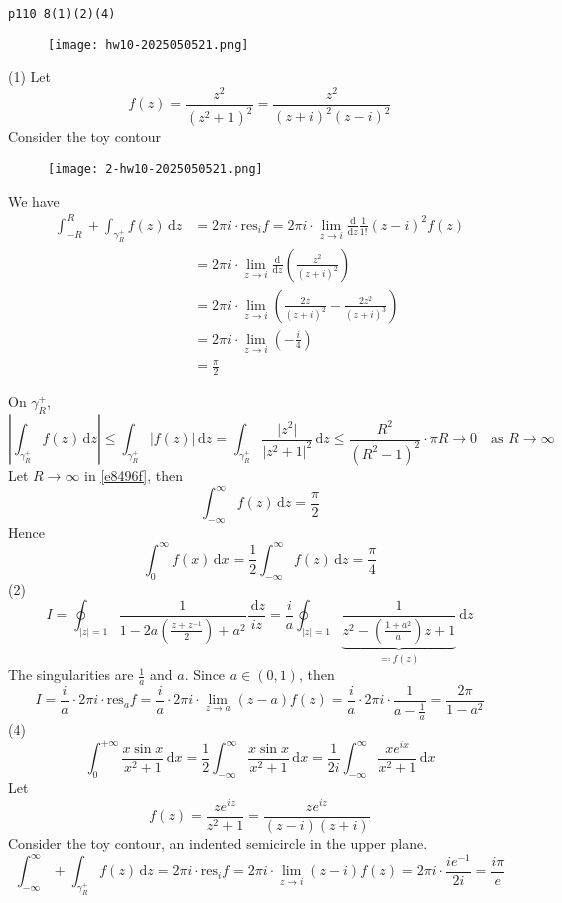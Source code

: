 \begin{lstlisting}
p110 8(1)(2)(4)
\end{lstlisting}
\begin{exercise}
\begin{figure}[H]
\centering
\texttt{[image: hw10-2025050521.png]}
\label{}
\end{figure}
\end{exercise}
(1)
Let
\[
f(z)=\frac{z^2}{(z^2+1)^2}=\frac{z^2}{(z+i)^2(z-i)^2}
\]
Consider the toy contour
\begin{figure}[H]
\centering
\texttt{[image: 2-hw10-2025050521.png]}
\label{}
\end{figure}
We have
\begin{equation}
\begin{aligned}
\int_{-R}^{R} +\int_{\gamma^{+}_{R}}f(z) \, \mathrm{d}z & =2\pi i \cdot\mathrm{res}_{i}f=2\pi i\cdot \lim_{ z \to i }\frac{\mathrm{d}}{\mathrm{d}z} \frac{1}{1!} (z-i)^2f(z) \\
 & =2\pi i\cdot \lim_{ z \to i } \frac{\mathrm{d}}{\mathrm{d}z} \left( \frac{z^2}{(z+i)^2} \right) \\
 & =2\pi i\cdot \lim_{ z \to i } \left( \frac{2z}{(z+i)^2}-\frac{2z^2}{(z+i)^{3}} \right)  \\
 & =2\pi i\cdot \lim_{ z \to i } \left( -\frac{i}{4}  \right) \\
 & =\frac{\pi}{2}
\end{aligned}
\label{e8496f}
\end{equation}

On $\gamma^{+}_{R}$,
\[
\left\lvert  \int_{\gamma_{R}^{+}}^{} f(z) \, \mathrm{d}z   \right\rvert \leq \int_{\gamma_{R}^{+}}^{} \lvert f(z) \rvert \, \mathrm{d}z  =\int_{\gamma_{R}^{+}}^{} \frac{\lvert z^2 \rvert }{\lvert z^2+1 \rvert ^2 } \, \mathrm{d}z\leq \frac{R^2}{(R^2-1)^2}\cdot \pi R\to0\quad \text{as }R\to \infty
\]
Let $R\to \infty$ in \cref{e8496f}, then
\[
\int_{-\infty}^{\infty} f(z) \, \mathrm{d}z =\frac{\pi }{2}
\]
Hence
\[
\int_{0}^{\infty} f(x) \, \mathrm{d}x =\frac{1}{2}\int_{-\infty}^{\infty} f(z) \, \mathrm{d}z =\frac{\pi }{4}
\]
(2)
\[
I=\oint_{|z|=1} \frac{1}{1-2 a\left(\frac{z+z^{-1}}{2}\right)+a^2} \frac{\mathrm{~d} z}{i z}=\frac{i}{a} \oint_{|z|=1} \underbrace{ \frac{1}{z^2-\left(\frac{1+a^2}{a}\right) z+1} }_{ \eqqcolon f(z) } \mathrm{~d} z
\]
The singularities are $\frac{1}{a}$ and $a$. Since $a\in(0,1)$, then
\[
I=\frac{i}{a}\cdot2\pi i\cdot \mathrm{res}_{a}f=\frac{i}{a}\cdot2\pi i\cdot \lim_{ z \to a } (z-a)f(z)=\frac{i}{a}\cdot2\pi i\cdot\frac{1}{a-\frac{1}{a}}=\frac{2\pi }{1-a^2}
\]
(4)
\[
\int_{0}^{+\infty} \frac{x\sin x}{x^2+1} \, \mathrm{d}x =\frac{1}{2}\int_{-\infty}^{\infty} \frac{x\sin x}{x^2+1} \, \mathrm{d}x =\frac{1}{2i}\int_{-\infty}^{\infty} \frac{xe^{ ix }}{x^2+1} \, \mathrm{d}x 
\]
Let
\[
f(z)=\frac{ze^{ iz }}{z^2+1}=\frac{ze^{ iz }}{(z-i)(z+i)}
\]
Consider the toy contour, an indented semicircle in the upper plane.
\begin{equation}
\int_{-\infty}^{\infty} +\int_{\gamma^{+}_{R}}^{}  f(z) \, \mathrm{d}z= 2\pi i\cdot \mathrm{res}_{i}f=2\pi i\cdot \lim_{ z \to i } (z-i)f(z)=2\pi i\cdot\frac{ie^{ -1 }}{2i}=\frac{i\pi}{e}
\label{11089d}
\end{equation}


